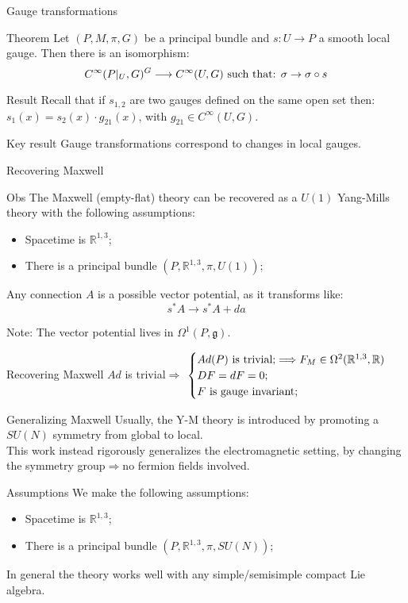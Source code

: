 \documentclass{beamer}
\begin{document}
\begin{frame}{Gauge transformations}
	\begin{alertblock}{Theorem}
		Let $(P,M,\pi,G)$ be a principal bundle and $s:U\rightarrow P$ a smooth local gauge. Then there is an isomorphism:
		$$C^\infty(P|_U,G)^G\longrightarrow C^\infty(U,G)\hbox{ such that: }\sigma\rightarrow \sigma\circ s$$
	\end{alertblock}
	\begin{block}{Result}
		Recall that if $s_{1,2}$ are two gauges defined on the same open set then: $s_1(x)=s_2(x)\cdot g_{21}(x)$, with $g_{21}\in C^\infty(U,G)$.
	\end{block}
	\begin{alertblock}{Key result}
		Gauge transformations correspond to changes in local gauges.
	\end{alertblock}
\end{frame}
\begin{frame}{Recovering Maxwell}
	\begin{exampleblock}{Obs}
		The Maxwell (empty-flat) theory can be recovered as a $U(1)$ Yang-Mills theory with the following assumptions:
		\begin{itemize}
			\item Spacetime is $\mathbb{R}^{1,3}$;
			\item There is a principal bundle $(P,\mathbb{R}^{1,3},\pi,U(1))$;
		\end{itemize}
	\end{exampleblock}
	Any connection $A$ is a possible vector potential, as it transforms like:
	$$s^*A\rightarrow s^*A+da$$
	\begin{alertblock}{Note:}
		The vector potential lives in $\Omega^1(P,\mathfrak{g})$.
	\end{alertblock}
\end{frame}
\begin{frame}{Recovering Maxwell}
	$Ad$ is trivial$\Longrightarrow$ 
	$\begin{cases}
		Ad(P)\hbox{ is trivial;}\Longrightarrow F_M\in\Omega^2(\mathbb{R}^{1,3},\mathbb{R})\\ 
		DF=dF=0;\\ 
		F \hbox{ is gauge invariant;}\\
	\end{cases}$
\end{frame}
\begin{frame}{Generalizing Maxwell}
	Usually, the Y-M theory is introduced by promoting a $SU(N)$ symmetry from global to local.\\
	This work instead rigorously generalizes the electromagnetic setting, by changing the symmetry group$\Longrightarrow$no fermion fields involved. 
	\begin{exampleblock}{Assumptions}
	We make the following assumptions:
	\begin{itemize}
		\item Spacetime is $\mathbb{R}^{1,3}$;
		\item There is a principal bundle $(P,\mathbb{R}^{1,3},\pi,SU(N))$;
	\end{itemize}
	In general the theory works well with any simple/semisimple compact Lie algebra.
\end{exampleblock}
\end{frame}
\end{document}
